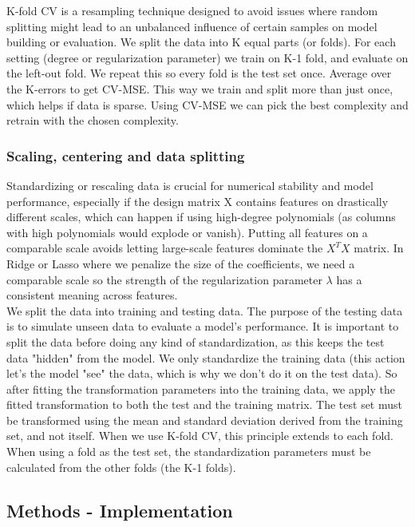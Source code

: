 \documentclass[amssymb,twocolumn,aps]{revtex4}
\begin{document}

K-fold CV is a resampling technique designed to avoid issues where random splitting might lead to an unbalanced influence of certain samples on model building or evaluation. We split the data into K equal parts (or folds). For each setting (degree or regularization parameter) we train on K-1 fold, and evaluate on the left-out fold. We repeat this so every fold is the test set once. Average over the K-errors to get CV-MSE. This way we train and split more than just once, which helps if data is sparse. Using CV-MSE we can pick the best complexity and retrain with the chosen complexity.  

\subsubsection{Scaling, centering and data splitting}

Standardizing or rescaling data is crucial for numerical stability and model performance, especially if the design matrix X contains features on drastically different scales, which can happen if using high-degree polynomials (as columns with high polynomials would explode or vanish). Putting all features on a comparable scale avoids letting large-scale features dominate the $X^TX$ matrix. In Ridge or Lasso where we penalize the size of the coefficients, we need a comparable scale so the strength of the regularization parameter $\lambda$ has a consistent meaning across features. \\

We split the data into training and testing data. The purpose of the testing data is to simulate unseen data to evaluate a model's performance. It is important to split the data before doing any kind of standardization, as this keeps the test data "hidden" from the model. We only standardize the training data (this action let's the model "see" the data, which is why we don't do it on the test data). So after fitting the transformation parameters into the training data, we apply the fitted transformation to both the test and the training matrix. The test set must be transformed using the mean and standard deviation derived from the training set, and not itself. When we use K-fold CV, this principle extends to each fold. When using a fold as the test set, the standardization parameters must be calculated from the other folds (the K-1 folds). 

\subsection{Methods - Implementation}
\label{section:methods}
\end{document}
